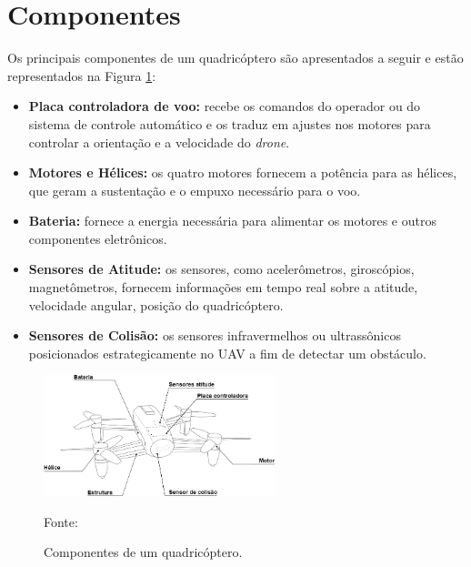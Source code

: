 \documentclass[main.tex]{subfiles}
\begin{document}
\section{Componentes}

Os principais componentes de um quadricóptero são apresentados a seguir e estão representados na Figura \ref{fig:componentes}:

\begin{itemize}
    \item \textbf{Placa controladora de voo:} \textcolor{att}{recebe os comandos do operador ou do sistema de controle automático e os traduz em ajustes nos motores para controlar a orientação e a velocidade do \textit{drone}.}
    \item \textbf{Motores e Hélices:} os quatro motores fornecem a potência para as hélices, que geram a sustentação e o empuxo necessário para o voo.
    \item \textbf{Bateria:} fornece a energia necessária para alimentar os motores e outros componentes eletrônicos.
    \item \textbf{Sensores de Atitude:} os sensores, como acelerômetros, giroscópios, magnetômetros, fornecem informações em tempo real sobre a atitude, velocidade angular, posição do quadricóptero.
    \item \textbf{Sensores de Colisão:} os sensores infravermelhos ou ultrassônicos posicionados estrategicamente no UAV a fim de detectar um obstáculo.
\end{itemize}

\begin{figure}[!h]
    \centering
    \caption{Componentes de um quadricóptero.}
    \includegraphics[width=0.6\textwidth]{capitulos/descricao/imgs/componentes.png}
    \label{fig:componentes}
    \begin{flushleft}
        \small{Fonte: \cite{componentes}}
	\end{flushleft}
\end{figure}
\end{document}
